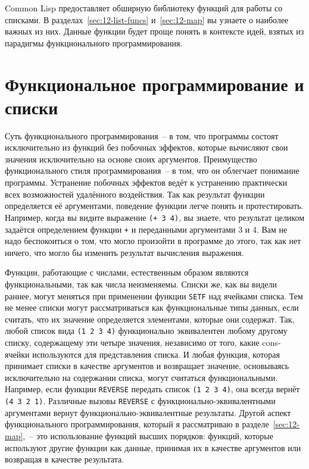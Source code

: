 Common Lisp предоставляет обширную библиотеку функций для работы со списками. В
разделах~\ref{sec:12-list-funcs} и~\ref{sec:12-map} вы узнаете о наиболее важных из
них. Данные функции будет проще понять в контексте идей, взятых из парадигмы
функционального программирования.

\section{Функциональное программирование и списки}

Суть функционального программирования~-- в том, что программы состоят исключительно из
функций без побочных эффектов, которые вычисляют свои значения исключительно на основе
своих аргументов. Преимущество функционального стиля программирования~-- в том, что он
облегчает понимание программы. Устранение побочных эффектов ведёт к устранению практически
всех возможностей удалённого воздействия. Так как результат функции определяется её
аргументами, поведение функции легче понять и протестировать. Например, когда вы видите
выражение \lstinline{(+ 3 4)}, вы знаете, что результат целиком задаётся определением функции
\lstinline{+} и переданными аргументами 3 и 4. Вам не надо беспокоиться о том, что могло
произойти в программе до этого, так как нет ничего, что могло бы изменить результат
вычисления выражения.

Функции, работающие с числами, естественным образом являются функциональными, так как числа
неизменяемы. Списки же, как вы видели раннее, могут меняться при применении функции
\lstinline{SETF} над ячейками списка. Тем не менее списки могут рассматриваться как
функциональные типы данных, если считать, что их значение определяется элементами, которые
они содержат. Так, любой список вида \lstinline{(1 2 3 4)} функционально эквивалентен любому
другому списку, содержащему эти четыре значения, независимо от того, какие cons-ячейки
используются для представления списка. И любая функция, которая принимает списки в
качестве аргументов и возвращает значение, основываясь исключительно на содержании списка,
могут считаться функциональными. Например, если функции \lstinline{REVERSE} передать список
\lstinline{(1 2 3 4)}, она всегда вернёт \lstinline{(4 3 2 1)}. Различные вызовы \lstinline{REVERSE} с
функционально-эквивалентными аргументами вернут функционально-эквивалентные
результаты. Другой аспект функционального программирования, который я рассматриваю в
разделе~\ref{sec:12-map},~-- это использование функций высших порядков: функций, которые
используют другие функции как данные, принимая их в качестве аргументов или возвращая в
качестве результата.

